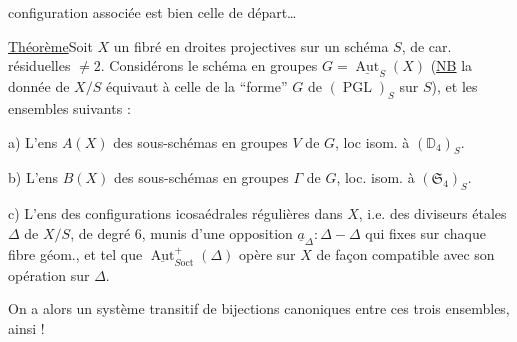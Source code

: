 configuration   associée est bien celle de départ\ldots

\uline{Théorème}\quad Soit $X$ un fibré en droites projectives sur un schéma $S$, de car. résiduelles $\ne2$. Considérons le  schéma en groupes $G=\underline{\operatorname{Aut}}_S(X)$ (\uline{NB} la donnée de $X/S$ équivaut à celle de la ``forme'' $G$ de $(\operatorname{PGL})_S$ sur $S$), et les ensembles suivants :

 a) L'ens $A(X)$ des sous-schémas en groupes $V$ de $G$, loc isom. à $(\mathbb D_4)_S$.

 b) L'ens  $B(X)$ des sous-schémas en groupes  $\Gamma$ de $G$, loc. isom. à $(\mathfrak S_4)_S$.

 c) L'ens des configurations icosaédrales régulières dans $X$, i.e. des diviseurs étales $\Delta$ de $X/S$, de degré $6$, munis d'une opposition $\underline a_\Delta:\Delta-\Delta$ qui  fixes sur chaque fibre géom., et tel que $\underline{\operatorname{Aut}}^+_{S\mathrm{oct}}(\Delta)$ opère sur $X$ de façon compatible avec son opération sur $\Delta$.

On a alors un système transitif de bijections canoniques entre ces trois ensembles,  ainsi !
